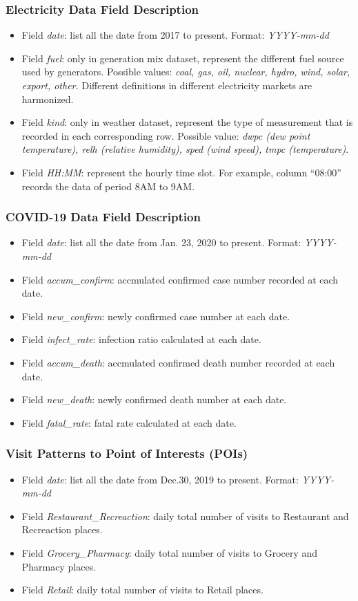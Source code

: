 \documentclass[11pt]{article}
\numberwithin{equation}{section}
\numberwithin{table}{section}
\numberwithin{figure}{section}
\begin{document}
\subsubsection{Electricity Data Field Description}
\begin{itemize}
	\item Field \textit{date}: list all the date from 2017 to present. Format: \textit{YYYY-mm-dd}
	\item Field \textit{fuel}: only in generation mix dataset, represent the different fuel source used by generators. Possible values: \textit{coal, gas, oil, nuclear, hydro, wind, solar, export, other.} Different definitions in different electricity markets are harmonized.
	\item Field \textit{kind}: only in weather dataset, represent the type of measurement that is recorded in each corresponding row. Possible value: \textit{dwpc (dew point temperature), relh (relative humidity), sped (wind speed), tmpc (temperature)}.
	\item Field \textit{HH:MM}: represent the hourly time slot. For example, column ``08:00'' records the data of period 8AM to 9AM.
\end{itemize}
\subsubsection{COVID-19 Data Field Description}
\begin{itemize}
	\item Field \textit{date}: list all the date from Jan. 23, 2020 to present. Format: \textit{YYYY-mm-dd}
	\item Field \textit{accum\_confirm}: accmulated confirmed case number recorded at each date.
	\item Field \textit{new\_confirm}: newly confirmed case number at each date.
	\item Field \textit{infect\_rate}: infection ratio calculated at each date.
	\item Field \textit{accum\_death}: accmulated confirmed death number recorded at each date.
	\item Field \textit{new\_death}: newly confirmed death number at each date.
	\item Field \textit{fatal\_rate}: fatal rate calculated at each date.
\end{itemize}
\subsubsection{Visit Patterns to Point of Interests (POIs)}
\begin{itemize}
	\item Field \textit{date}: list all the date from Dec.30, 2019 to present. Format: \textit{YYYY-mm-dd}
	\item Field \textit{Restaurant\_Recreaction}: daily total number of visits to Restaurant and Recreaction places. 
	\item Field \textit{Grocery\_Pharmacy}: daily total number of visits to Grocery and Pharmacy places.
	\item Field \textit{Retail}: daily total number of visits to Retail places. 
\end{itemize}
\end{document}
